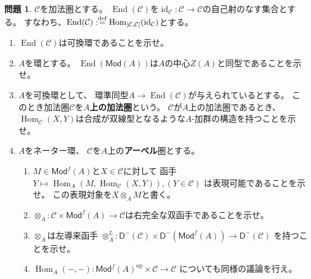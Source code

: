 \documentclass[uplatex,dvipdfmx]{jsarticle}
\theoremstyle{definition}
\newtheorem{prob}[prob]{問題}
\DeclareMathOperator{\Hom}{\mathrm{Hom}}
\DeclareMathOperator{\End}{\mathrm{End}}
\DeclareMathOperator{\id}{\mathrm{id}}
\newcommand{\op}{\mathrm{op}}
\newcommand{\Mod}{\mathsf{Mod}}
\newcommand{\sfD}{\mathsf{D}}
\newcommand\mcC{\mathcal{C}}
\def\dfn{:\overset{\mbox{{\scriptsize def}}}{=}}
\begin{document}
\begin{prob}\label{1.37}
  \(\mcC\)を加法圏とする。
  \(\End(\mcC)\)を\(\id_{\mcC}:\mcC\to \mcC\)の自己射のなす集合とする。
  すなわち、\(\End(\mcC) \dfn \Hom_{[\mcC,\mcC]}(\id_{\mcC})\)とする。
  \begin{enumerate}
    \item \label{1.37.1}
    \(\End(\mcC)\)は可換環であることを示せ。
    \item \label{1.37.2}
    \(A\)を環とする。
    \(\End(\Mod(A))\)は\(A\)の中心\(Z(A)\)と同型であることを示せ。
    \item \label{1.37.3}
    \(A\)を可換環として、
    環準同型\(A\to \End(\mcC)\)が与えられているとする。
    このとき加法圏\(\mcC\)を\textbf{\(A\)上の加法圏}という。
    \(\mcC\)が\(A\)上の加法圏であるとき、
    \(\Hom_{\mcC}(X,Y)\)は合成が双線型となるような\(A\)-加群の構造を持つことを示せ。
    \item \label{1.37.4}
    \(A\)をネーター環、
    \(\mcC\)を\(A\)上の\textbf{アーベル}圏とする。
    \begin{enumerate}
      \item \label{1.37.4.1}
      \(M\in \Mod^f(A)\)と\(X\in \mcC\)に対して
      函手\(Y\mapsto \Hom_A(M,\Hom_{\mcC}(X,Y)), (Y\in \mcC)\)
      は表現可能であることを示せ。
      この表現対象を\(X\otimes_A M\)と書く。
      \item \label{1.37.4.2}
      \(\otimes_A:\mcC\times\Mod^f(A)\to \mcC\)は右完全な双函手であることを示せ。
      \item \label{1.37.4.3}
      \(\otimes_A\)は左導来函手
      \(\otimes_A^L:\sfD^-(\mcC)\times \sfD^-(\Mod^f(A))\to \sfD^-(\mcC)\)
      を持つことを示せ。
      \item \label{1.37.4.4}
      \(\Hom_A(-,-):\Mod^f(A)^{\op}\times \mcC\to \mcC\)
      についても同様の議論を行え。
    \end{enumerate}
  \end{enumerate}
\end{prob}
\end{document}
